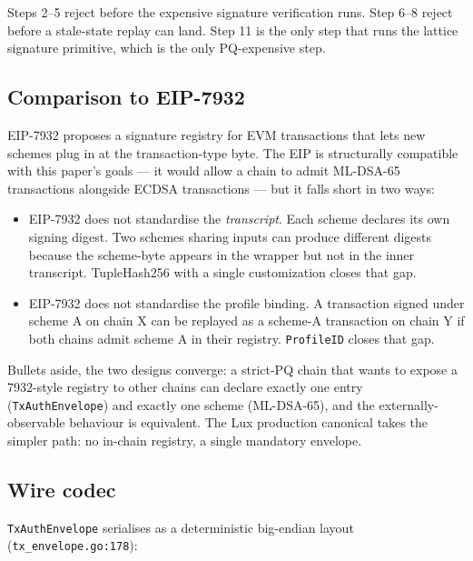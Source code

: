 Steps 2--5 reject before the expensive signature verification runs. Step 6--8
reject before a stale-state replay can land. Step 11 is the only step that
runs the lattice signature primitive, which is the only PQ-expensive step.

\subsection{Comparison to EIP-7932}

EIP-7932 \cite{eip7932} proposes a signature registry for EVM transactions
that lets new schemes plug in at the transaction-type byte. The EIP is
structurally compatible with this paper's goals --- it would allow a chain to
admit ML-DSA-65 transactions alongside ECDSA transactions --- but it falls
short in two ways:

\begin{itemize}[leftmargin=2em,nosep]
  \item EIP-7932 does not standardise the \emph{transcript}. Each scheme
    declares its own signing digest. Two schemes sharing inputs can produce
    different digests because the scheme-byte appears in the wrapper but
    not in the inner transcript. TupleHash256 with a single customization
    closes that gap.
  \item EIP-7932 does not standardise the profile binding. A transaction
    signed under scheme A on chain X can be replayed as a scheme-A
    transaction on chain Y if both chains admit scheme A in their
    registry. \texttt{ProfileID} closes that gap.
\end{itemize}

Bullets aside, the two designs converge: a strict-PQ chain that wants to
expose a 7932-style registry to other chains can declare exactly one entry
(\texttt{TxAuthEnvelope}) and exactly one scheme (ML-DSA-65), and the
externally-observable behaviour is equivalent. The Lux production canonical
takes the simpler path: no in-chain registry, a single mandatory envelope.

\subsection{Wire codec}

\texttt{TxAuthEnvelope} serialises as a deterministic big-endian layout
(\texttt{tx\_envelope.go:178}):

